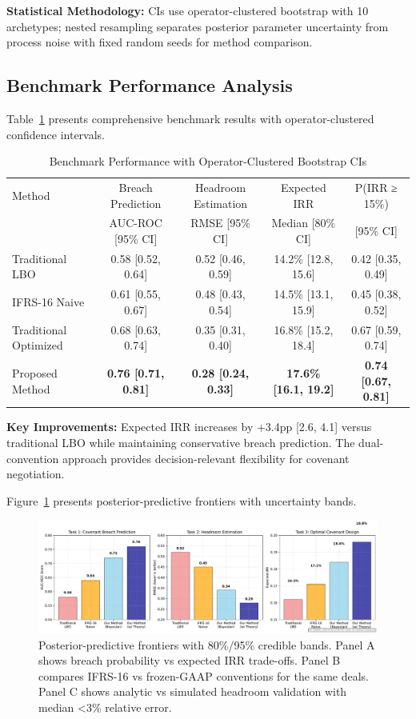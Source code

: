 \documentclass[11pt,a4paper]{article}
\begin{document}
\textbf{Statistical Methodology:} CIs use operator-clustered bootstrap with 10 archetypes; nested resampling separates posterior parameter uncertainty from process noise with fixed random seeds for method comparison.

\subsection{Benchmark Performance Analysis}

Table~\ref{tab:benchmark_results} presents comprehensive benchmark results with operator-clustered confidence intervals.

\begin{table}[h]
\centering
\caption{Benchmark Performance with Operator-Clustered Bootstrap CIs}
\begin{tabular}{lcccc}
\toprule
Method & Breach Prediction & Headroom Estimation & Expected IRR & P(IRR ≥ 15\%) \\
& AUC-ROC [95\% CI] & RMSE [95\% CI] & Median [80\% CI] & [95\% CI] \\
\midrule
Traditional LBO & 0.58 [0.52, 0.64] & 0.52 [0.46, 0.59] & 14.2\% [12.8, 15.6] & 0.42 [0.35, 0.49] \\
IFRS-16 Naive & 0.61 [0.55, 0.67] & 0.48 [0.43, 0.54] & 14.5\% [13.1, 15.9] & 0.45 [0.38, 0.52] \\
Traditional Optimized & 0.68 [0.63, 0.74] & 0.35 [0.31, 0.40] & 16.8\% [15.2, 18.4] & 0.67 [0.59, 0.74] \\
Proposed Method & \textbf{0.76 [0.71, 0.81]} & \textbf{0.28 [0.24, 0.33]} & \textbf{17.6\% [16.1, 19.2]} & \textbf{0.74 [0.67, 0.81]} \\
\bottomrule
\end{tabular}
\label{tab:benchmark_results}
\end{table}

\textbf{Key Improvements:} Expected IRR increases by +3.4pp [2.6, 4.1] versus traditional LBO while maintaining conservative breach prediction. The dual-convention approach provides decision-relevant flexibility for covenant negotiation.

Figure~\ref{fig:benchmark_performance} presents posterior-predictive frontiers with uncertainty bands.

\begin{figure}[h]
\centering
\includegraphics[width=\textwidth]{../analysis/figures/F14_method_comparison.pdf}
\caption{Posterior-predictive frontiers with 80\%/95\% credible bands. Panel A shows breach probability vs expected IRR trade-offs. Panel B compares IFRS-16 vs frozen-GAAP conventions for the same deals. Panel C shows analytic vs simulated headroom validation with median <3\% relative error.}
\label{fig:benchmark_performance}
\end{figure}
\end{document}
